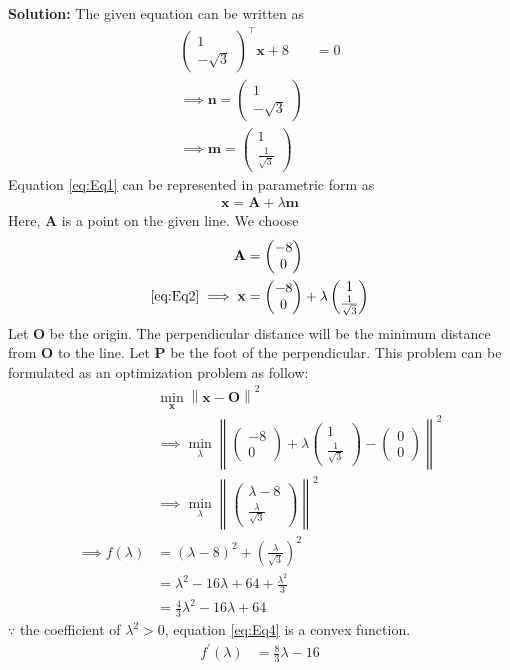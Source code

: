 \documentclass[12pt]{article}
\providecommand{\brak}[1]{\ensuremath{\left(#1\right)}}
\providecommand{\norm}[1]{\left\lVert#1\right\rVert}
\newcommand{\solution}{\noindent \textbf{Solution: }}
\newcommand{\myvec}[1]{\ensuremath{\begin{pmatrix}#1\end{pmatrix}}}
\let\vec\mathbf
\begin{document}
\begin{enumerate}
\solution 
The given equation can be written as
\begin{align}
	\label{eq:Eq1}
	\myvec{1 \\ -\sqrt{3}}^\top\vec{x}+8 &= 0 \\
	\implies \vec{n} = \myvec{1 \\ -\sqrt{3}} \\
	\implies \vec{m} = \myvec{1 \\ \frac{1}{\sqrt{3}}}
\end{align}
Equation \eqref{eq:Eq1} can be represented in parametric form as
\begin{align}
	\label{eq:Eq2}
	\vec{x} = \vec{A}+\lambda\vec{m}
\end{align}
Here, $\vec{A}$ is a point on the given line. We choose  
\begin{align}
	\vec{A} &= \myvec{-8 \\ 0}\\
	\label{eq:Eqx}
	\eqref{eq:Eq2} \implies \vec{x} &= \myvec{-8 \\ 0}+\lambda\myvec{1 \\ \frac{1}{\sqrt{3}}} 
\end{align}
Let $\vec{O}$ be the origin. The perpendicular distance will be the minimum distance from $\vec{O}$ to the line. Let $\vec{P}$ be the foot of the perpendicular. This problem can be formulated as an optimization problem as follow:
\begin{align}
	\label{eq:Eq3}
	&  \min_{\vec{x}} \norm{\vec{x}-\vec{O}}^2\\
	& \implies \min_{\lambda} \norm{ \myvec{-8 \\ 0}+\lambda\myvec{1 \\ \frac{1}{\sqrt{3}}} -\myvec{0 \\ 0}}^2\\
	& \implies \min_{\lambda} \norm{ \myvec{\lambda-8 \\ \frac{\lambda}{\sqrt{3}}}}^2 \\ 
	\implies f\brak{\lambda} &= \brak{\lambda-8}^2 + \brak{\frac{\lambda}{\sqrt{3}}}^2 \\ 
	&= \lambda^2-16\lambda+64+\frac{\lambda^2}{3}\\
	\label{eq:Eq4}
	&= \frac{4}{3}\lambda^2-16\lambda+64
\end{align}
$\because$ the coefficient of $\lambda^2> 0$, equation \eqref{eq:Eq4} is a convex function.
\begin{align}
	f^\prime\brak{\lambda} &= \frac{8}{3}\lambda - 16 
\end{align}	
\begin{enumerate}

\end{enumerate}
\end{enumerate}
\end{document}

